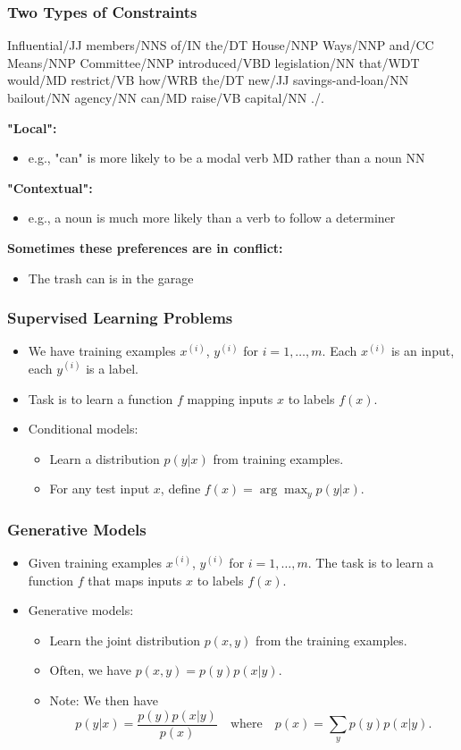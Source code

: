 \documentclass[handout]{beamer}
\begin{document}
\begin{frame}
  \frametitle{Two Types of Constraints}
  Influential/JJ members/NNS of/IN the/DT House/NNP Ways/NNP and/CC Means/NNP Committee/NNP introduced/VBD legislation/NN that/WDT would/MD restrict/VB how/WRB the/DT new/JJ savings-and-loan/NN bailout/NN agency/NN can/MD raise/VB capital/NN ./.

  \textbf{"Local":}
  \begin{itemize}
    \item e.g., "can" is more likely to be a modal verb MD rather than a noun NN
  \end{itemize}

  \textbf{"Contextual":}
  \begin{itemize}
    \item e.g., a noun is much more likely than a verb to follow a determiner
  \end{itemize}

  \textbf{Sometimes these preferences are in conflict:}
  \begin{itemize}
    \item The trash can is in the garage
  \end{itemize}
\end{frame}

\begin{frame}
  \frametitle{Supervised Learning Problems}
  \begin{itemize}
    \item We have training examples $x^{(i)}$, $y^{(i)}$ for $i = 1, \ldots, m$. Each $x^{(i)}$ is an input, each $y^{(i)}$ is a label.
    \item Task is to learn a function $f$ mapping inputs $x$ to labels $f(x)$.
    \item Conditional models:
    \begin{itemize}
      \item Learn a distribution $p(y|x)$ from training examples.
      \item For any test input $x$, define $f(x) = \arg \max_y p(y|x)$.
    \end{itemize}
  \end{itemize}
\end{frame}

\begin{frame}
  \frametitle{Generative Models}
  \begin{itemize}
    \item Given training examples $x^{(i)}$, $y^{(i)}$ for $i = 1, \ldots, m$. The task is to learn a function $f$ that maps inputs $x$ to labels $f(x)$.
    \item Generative models:
    \begin{itemize}
      \item Learn the joint distribution $p(x, y)$ from the training examples.
      \item Often, we have $p(x, y) = p(y)p(x|y)$.
      \item Note: We then have
      \[
        p(y|x) = \frac{p(y)p(x|y)}{p(x)} \quad \text{where} \quad p(x) = \sum_y p(y)p(x|y).
      \]
    \end{itemize}
  \end{itemize}
\end{frame}
\end{document}
